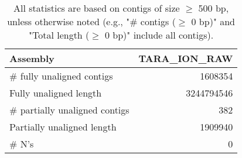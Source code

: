 \documentclass[12pt,a4paper]{article}
\begin{document}
\begin{table}[ht]
\begin{center}
\caption{All statistics are based on contigs of size $\geq$ 500 bp, unless otherwise noted (e.g., "\# contigs ($\geq$ 0 bp)" and "Total length ($\geq$ 0 bp)" include all contigs).}
\begin{tabular}{|l*{1}{|r}|}
\hline
Assembly & TARA\_ION\_RAW \\ \hline
\# fully unaligned contigs & 1608354 \\ \hline
Fully unaligned length & 3244794546 \\ \hline
\# partially unaligned contigs & 382 \\ \hline
Partially unaligned length & 1909940 \\ \hline
\# N's & 0 \\ \hline
\end{tabular}
\end{center}
\end{table}
\end{document}
